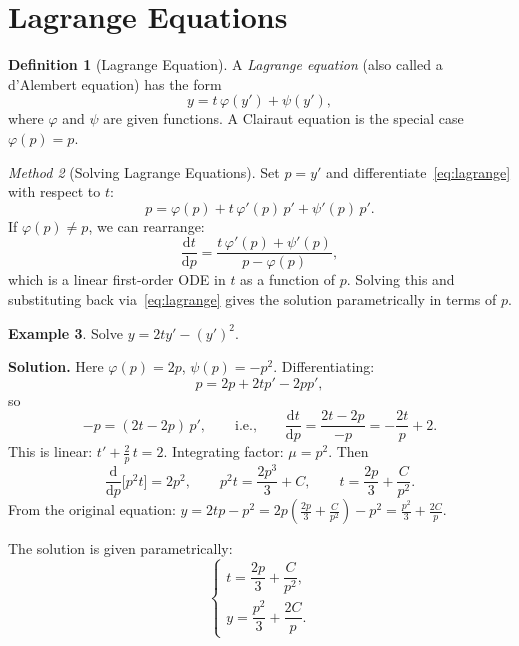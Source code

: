 \documentclass[12pt,a4paper,openany]{book}
\theoremstyle{definition}
\newtheorem{definition}{Definition}[chapter]
\newtheorem{example}[definition]{Example}
\theoremstyle{plain}
\theoremstyle{remark}
\newtheorem{method}[definition]{Method}
\newcommand{\dd}{\mathrm{d}}
\begin{document}
\section{Lagrange Equations}
\label{sec:lagrange}

\begin{definition}[Lagrange Equation]
\label{def:lagrange}
A \emph{Lagrange equation} (also called a d'Alembert equation) has the form
\begin{equation}\label{eq:lagrange}
  y = t\,\varphi(y') + \psi(y'),
\end{equation}
where $\varphi$ and $\psi$ are given functions. A Clairaut equation is the special case $\varphi(p) = p$.
\end{definition}

\begin{method}[Solving Lagrange Equations]
\label{meth:lagrange}
Set $p = y'$ and differentiate~\eqref{eq:lagrange} with respect to $t$:
\[
  p = \varphi(p) + t\,\varphi'(p)\,p' + \psi'(p)\,p'.
\]
If $\varphi(p)\ne p$, we can rearrange:
\[
  \frac{\dd t}{\dd p} = \frac{t\,\varphi'(p) + \psi'(p)}{p - \varphi(p)},
\]
which is a linear first-order ODE in $t$ as a function of $p$. Solving this and substituting back via~\eqref{eq:lagrange} gives the solution parametrically in terms of $p$.
\end{method}

\begin{example}
\label{ex:lagrange-1}
Solve $y = 2ty' - (y')^2$.

\textbf{Solution.} Here $\varphi(p) = 2p$, $\psi(p) = -p^2$. Differentiating:
\[
  p = 2p + 2tp' - 2pp',
\]
so
\[
  -p = (2t - 2p)\,p',
  \qquad\text{i.e.,}\qquad
  \frac{\dd t}{\dd p} = \frac{2t - 2p}{-p} = -\frac{2t}{p} + 2.
\]
This is linear: $t' + \frac{2}{p}\,t = 2$. Integrating factor: $\mu = p^2$. Then
\[
  \frac{\dd}{\dd p}\!\bigl[p^2 t\bigr] = 2p^2,
  \qquad
  p^2 t = \frac{2p^3}{3} + C,
  \qquad
  t = \frac{2p}{3} + \frac{C}{p^2}.
\]
From the original equation: $y = 2tp - p^2 = 2p\!\left(\frac{2p}{3}+\frac{C}{p^2}\right) - p^2 = \frac{p^2}{3} + \frac{2C}{p}$.

The solution is given parametrically:
\[
  \begin{cases}
    t = \dfrac{2p}{3} + \dfrac{C}{p^2}, \\[8pt]
    y = \dfrac{p^2}{3} + \dfrac{2C}{p}.
  \end{cases}
\]
\end{example}
\end{document}
